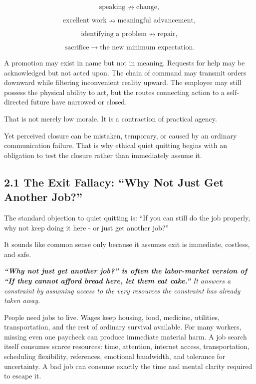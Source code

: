 \documentclass[11pt,oneside]{article}
\renewenvironment{quote}
  {\begin{tcolorbox}[
      enhanced,
      breakable,
      colback=ManifestLight,
      colframe=ManifestRule,
      boxrule=0pt,
      leftrule=3pt,
      arc=0pt,
      outer arc=0pt,
      left=10pt,right=10pt,top=8pt,bottom=8pt,
      before skip=0.8em,after skip=0.8em
    ]\itshape}
  {\end{tcolorbox}}
\begin{document}
\[
\text{speaking} \nrightarrow \text{change},
\]

\[
\text{excellent work} \nrightarrow \text{meaningful advancement},
\]

\[
\text{identifying a problem} \nrightarrow \text{repair},
\]

\[
\text{sacrifice} \rightarrow \text{the new minimum expectation}.
\]

A promotion may exist in name but not in meaning. Requests for help may
be acknowledged but not acted upon. The chain of command may transmit
orders downward while filtering inconvenient reality upward. The
employee may still possess the physical ability to act, but the routes
connecting action to a self-directed future have narrowed or closed.

That is not merely low morale. It is a contraction of practical agency.

Yet perceived closure can be mistaken, temporary, or caused by an
ordinary communication failure. That is why ethical quiet quitting
begins with an obligation to test the closure rather than immediately
assume it.


\subsection{2.1 The Exit Fallacy: ``Why Not Just Get Another
Job?''}\label{the-exit-fallacy-why-not-just-get-another-job}

The standard objection to quiet quitting is: ``If you can still do the
job properly, why not keep doing it here - or just get another job?''

It sounds like common sense only because it assumes exit is immediate,
costless, and safe.

\begin{quote}
\textbf{``Why not just get another job?'' is often the labor-market
version of ``If they cannot afford bread here, let them eat cake.''} It
answers a constraint by assuming access to the very resources the
constraint has already taken away.
\end{quote}

People need jobs to live. Wages keep housing, food, medicine, utilities,
transportation, and the rest of ordinary survival available. For many
workers, missing even one paycheck can produce immediate material harm.
A job search itself consumes scarce resources: time, attention, internet
access, transportation, scheduling flexibility, references, emotional
bandwidth, and tolerance for uncertainty. A bad job can consume exactly
the time and mental clarity required to escape it.
\end{document}
